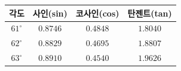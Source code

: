 {\renewcommand{\arraystretch}{1.45}\small
\begin{tabular}{|c|c|c|c|}
\hline
각도 & 사인(sin) & 코사인(cos) & 탄젠트(tan) \\ \hline
$61^\circ$ & $0.8746$ & $0.4848$ & $1.8040$ \\ \hline
$62^\circ$ & $0.8829$ & $0.4695$ & $1.8807$ \\ \hline
$63^\circ$ & $0.8910$ & $0.4540$ & $1.9626$ \\ \hline
\end{tabular}}
